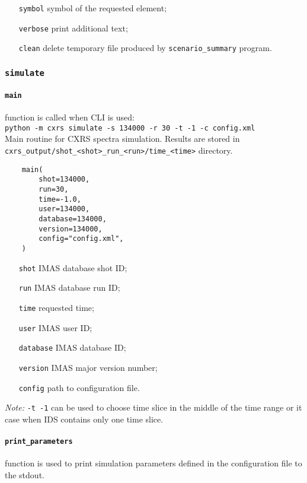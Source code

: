 \documentclass[../../main]{subfiles}
\begin{document}
\begin{itemize}[align=left]
    \item[\texttt{symbol}] symbol of the requested element;
    \item[\texttt{verbose}] print additional text;
    \item[\texttt{clean}] delete temporary file produced by \texttt{scenario_summary} program.
\end{itemize}

\subsubsection{\texttt{simulate}}

\paragraph{\texttt{main}} function is called when CLI is used:\\
\texttt{python -m cxrs simulate -s 134000 -r 30 -t -1 -c config.xml}\\
Main routine for CXRS spectra simulation. Results are stored in \texttt{cxrs\_output/shot\_<shot>\_run\_<run>/time\_<time>} directory.

\begin{verbatim}
    main(
        shot=134000,
        run=30,
        time=-1.0,
        user=134000,
        database=134000,
        version=134000,
        config="config.xml",
    )
\end{verbatim}

\begin{itemize}[align=left]
    \item[\texttt{shot}] IMAS database shot ID;
    \item[\texttt{run}] IMAS database run ID;
    \item[\texttt{time}] requested time;
    \item[\texttt{user}] IMAS user ID;
    \item[\texttt{database}] IMAS database ID;
    \item[\texttt{version}] IMAS major version number;
    \item[\texttt{config}] path to configuration file.
\end{itemize}
\emph{Note:} \texttt{-t -1} can be used to choose time slice in the middle of the time range or it case when IDS contains only one time slice.

\paragraph{\texttt{print\_parameters}} function is used to print simulation parameters defined in the configuration file to the stdout.
\end{document}
